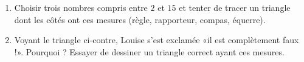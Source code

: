 

\begin{multicols}{2}

    \begin{center}
   
    \end{center}

\columnbreak


\begin{enumerate}
    \item
        
Choisir trois nombres compris entre $2$ et $15$ et tenter de tracer un triangle dont les côtés ont ces mesures (règle, rapporteur, compas, équerre).

\item

    Voyant le triangle ci-contre, Louise s'est exclamée «il est complètement faux !». Pourquoi ? Essayer de dessiner un triangle correct ayant ces mesures.

\end{enumerate}
\end{multicols}
